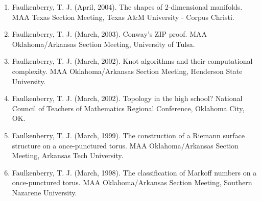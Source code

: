\documentclass[article,10pt]{article}
\begin{document}
\begin{enumerate}
\item Faulkenberry, T. J. (April, 2004). The shapes of 2-dimensional manifolds. MAA Texas Section Meeting, Texas A\&M University - Corpus Christi.
\item Faulkenberry, T. J. (March, 2003). Conway’s ZIP proof. MAA Oklahoma/Arkansas Section Meeting, University of Tulsa.
\item Faulkenberry, T. J. (March, 2002). Knot algorithms and their computational complexity. MAA Oklahoma/Arkansas Section Meeting, Henderson State University.
\item Faulkenberry, T. J. (March, 2002). Topology in the high school? National Council of Teachers of Mathematics Regional Conference, Oklahoma City, OK.
\item Faulkenberry, T. J. (March, 1999). The construction of a Riemann surface structure on a once-punctured torus. MAA Oklahoma/Arkansas Section Meeting, Arkansas Tech University.
\item Faulkenberry, T. J. (March, 1998). The classification of Markoff numbers on a once-punctured torus. MAA Oklahoma/Arkansas Section Meeting, Southern Nazarene University.
\end{enumerate}
\end{document}

